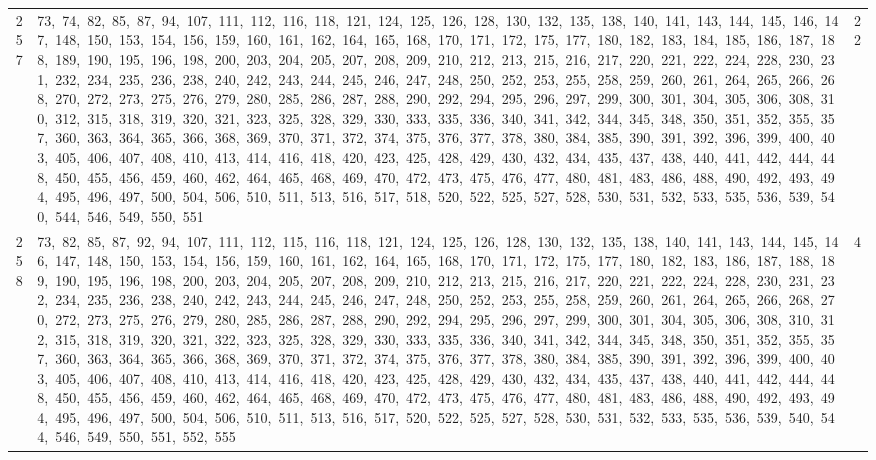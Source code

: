 \begin{longtable}{c|p{}|r}
257 & 73,\ 74,\ 82,\ 85,\ 87,\ 94,\ 107,\ 111,\ 112,\ 116,\ 118,\ 121,\ 124,\ 125,\ 126,\ 128,\ 130,\ 132,\ 135,\ 138,\ 140,\ 141,\ 143,\ 144,\ 145,\ 146,\ 147,\ 148,\ 150,\ 153,\ 154,\ 156,\ 159,\ 160,\ 161,\ 162,\ 164,\ 165,\ 168,\ 170,\ 171,\ 172,\ 175,\ 177,\ 180,\ 182,\ 183,\ 184,\ 185,\ 186,\ 187,\ 188,\ 189,\ 190,\ 195,\ 196,\ 198,\ 200,\ 203,\ 204,\ 205,\ 207,\ 208,\ 209,\ 210,\ 212,\ 213,\ 215,\ 216,\ 217,\ 220,\ 221,\ 222,\ 224,\ 228,\ 230,\ 231,\ 232,\ 234,\ 235,\ 236,\ 238,\ 240,\ 242,\ 243,\ 244,\ 245,\ 246,\ 247,\ 248,\ 250,\ 252,\ 253,\ 255,\ 258,\ 259,\ 260,\ 261,\ 264,\ 265,\ 266,\ 268,\ 270,\ 272,\ 273,\ 275,\ 276,\ 279,\ 280,\ 285,\ 286,\ 287,\ 288,\ 290,\ 292,\ 294,\ 295,\ 296,\ 297,\ 299,\ 300,\ 301,\ 304,\ 305,\ 306,\ 308,\ 310,\ 312,\ 315,\ 318,\ 319,\ 320,\ 321,\ 323,\ 325,\ 328,\ 329,\ 330,\ 333,\ 335,\ 336,\ 340,\ 341,\ 342,\ 344,\ 345,\ 348,\ 350,\ 351,\ 352,\ 355,\ 357,\ 360,\ 363,\ 364,\ 365,\ 366,\ 368,\ 369,\ 370,\ 371,\ 372,\ 374,\ 375,\ 376,\ 377,\ 378,\ 380,\ 384,\ 385,\ 390,\ 391,\ 392,\ 396,\ 399,\ 400,\ 403,\ 405,\ 406,\ 407,\ 408,\ 410,\ 413,\ 414,\ 416,\ 418,\ 420,\ 423,\ 425,\ 428,\ 429,\ 430,\ 432,\ 434,\ 435,\ 437,\ 438,\ 440,\ 441,\ 442,\ 444,\ 448,\ 450,\ 455,\ 456,\ 459,\ 460,\ 462,\ 464,\ 465,\ 468,\ 469,\ 470,\ 472,\ 473,\ 475,\ 476,\ 477,\ 480,\ 481,\ 483,\ 486,\ 488,\ 490,\ 492,\ 493,\ 494,\ 495,\ 496,\ 497,\ 500,\ 504,\ 506,\ 510,\ 511,\ 513,\ 516,\ 517,\ 518,\ 520,\ 522,\ 525,\ 527,\ 528,\ 530,\ 531,\ 532,\ 533,\ 535,\ 536,\ 539,\ 540,\ 544,\ 546,\ 549,\ 550,\ 551 & 22 \\
258 & 73,\ 82,\ 85,\ 87,\ 92,\ 94,\ 107,\ 111,\ 112,\ 115,\ 116,\ 118,\ 121,\ 124,\ 125,\ 126,\ 128,\ 130,\ 132,\ 135,\ 138,\ 140,\ 141,\ 143,\ 144,\ 145,\ 146,\ 147,\ 148,\ 150,\ 153,\ 154,\ 156,\ 159,\ 160,\ 161,\ 162,\ 164,\ 165,\ 168,\ 170,\ 171,\ 172,\ 175,\ 177,\ 180,\ 182,\ 183,\ 186,\ 187,\ 188,\ 189,\ 190,\ 195,\ 196,\ 198,\ 200,\ 203,\ 204,\ 205,\ 207,\ 208,\ 209,\ 210,\ 212,\ 213,\ 215,\ 216,\ 217,\ 220,\ 221,\ 222,\ 224,\ 228,\ 230,\ 231,\ 232,\ 234,\ 235,\ 236,\ 238,\ 240,\ 242,\ 243,\ 244,\ 245,\ 246,\ 247,\ 248,\ 250,\ 252,\ 253,\ 255,\ 258,\ 259,\ 260,\ 261,\ 264,\ 265,\ 266,\ 268,\ 270,\ 272,\ 273,\ 275,\ 276,\ 279,\ 280,\ 285,\ 286,\ 287,\ 288,\ 290,\ 292,\ 294,\ 295,\ 296,\ 297,\ 299,\ 300,\ 301,\ 304,\ 305,\ 306,\ 308,\ 310,\ 312,\ 315,\ 318,\ 319,\ 320,\ 321,\ 322,\ 323,\ 325,\ 328,\ 329,\ 330,\ 333,\ 335,\ 336,\ 340,\ 341,\ 342,\ 344,\ 345,\ 348,\ 350,\ 351,\ 352,\ 355,\ 357,\ 360,\ 363,\ 364,\ 365,\ 366,\ 368,\ 369,\ 370,\ 371,\ 372,\ 374,\ 375,\ 376,\ 377,\ 378,\ 380,\ 384,\ 385,\ 390,\ 391,\ 392,\ 396,\ 399,\ 400,\ 403,\ 405,\ 406,\ 407,\ 408,\ 410,\ 413,\ 414,\ 416,\ 418,\ 420,\ 423,\ 425,\ 428,\ 429,\ 430,\ 432,\ 434,\ 435,\ 437,\ 438,\ 440,\ 441,\ 442,\ 444,\ 448,\ 450,\ 455,\ 456,\ 459,\ 460,\ 462,\ 464,\ 465,\ 468,\ 469,\ 470,\ 472,\ 473,\ 475,\ 476,\ 477,\ 480,\ 481,\ 483,\ 486,\ 488,\ 490,\ 492,\ 493,\ 494,\ 495,\ 496,\ 497,\ 500,\ 504,\ 506,\ 510,\ 511,\ 513,\ 516,\ 517,\ 520,\ 522,\ 525,\ 527,\ 528,\ 530,\ 531,\ 532,\ 533,\ 535,\ 536,\ 539,\ 540,\ 544,\ 546,\ 549,\ 550,\ 551,\ 552,\ 555 & 4 \\

\end{longtable}
